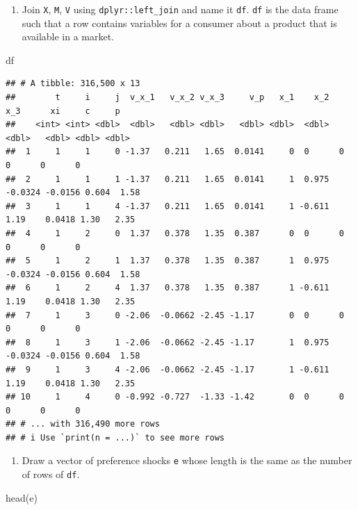 \documentclass[
]{book}
\newenvironment{Shaded}{\begin{snugshade}}{\end{snugshade}}
\newcommand{\FunctionTok}[1]{\textcolor[rgb]{0.00,0.00,0.00}{#1}}
\newcommand{\NormalTok}[1]{#1}
\providecommand{\tightlist}{%
  \setlength{\itemsep}{0pt}\setlength{\parskip}{0pt}}
\begin{document}
\begin{enumerate}
\def\labelenumi{\arabic{enumi}.}
\setcounter{enumi}{4}
\tightlist
\item
  Join \texttt{X}, \texttt{M}, \texttt{V} using \texttt{dplyr::left\_join} and name it \texttt{df}. \texttt{df} is the data frame such that a row contains variables for a consumer about a product that is available in a market.
\end{enumerate}

\begin{Shaded}
\begin{Highlighting}[]
\NormalTok{df}
\end{Highlighting}
\end{Shaded}

\begin{verbatim}
## # A tibble: 316,500 x 13
##        t     i     j  v_x_1   v_x_2 v_x_3     v_p   x_1    x_2     x_3      xi     c     p
##    <int> <int> <dbl>  <dbl>   <dbl> <dbl>   <dbl> <dbl>  <dbl>   <dbl>   <dbl> <dbl> <dbl>
##  1     1     1     0 -1.37   0.211   1.65  0.0141     0  0      0       0      0      0   
##  2     1     1     1 -1.37   0.211   1.65  0.0141     1  0.975 -0.0324 -0.0156 0.604  1.58
##  3     1     1     4 -1.37   0.211   1.65  0.0141     1 -0.611  1.19    0.0418 1.30   2.35
##  4     1     2     0  1.37   0.378   1.35  0.387      0  0      0       0      0      0   
##  5     1     2     1  1.37   0.378   1.35  0.387      1  0.975 -0.0324 -0.0156 0.604  1.58
##  6     1     2     4  1.37   0.378   1.35  0.387      1 -0.611  1.19    0.0418 1.30   2.35
##  7     1     3     0 -2.06  -0.0662 -2.45 -1.17       0  0      0       0      0      0   
##  8     1     3     1 -2.06  -0.0662 -2.45 -1.17       1  0.975 -0.0324 -0.0156 0.604  1.58
##  9     1     3     4 -2.06  -0.0662 -2.45 -1.17       1 -0.611  1.19    0.0418 1.30   2.35
## 10     1     4     0 -0.992 -0.727  -1.33 -1.42       0  0      0       0      0      0   
## # ... with 316,490 more rows
## # i Use `print(n = ...)` to see more rows
\end{verbatim}

\begin{enumerate}
\def\labelenumi{\arabic{enumi}.}
\setcounter{enumi}{5}
\tightlist
\item
  Draw a vector of preference shocks \texttt{e} whose length is the same as the number of rows of \texttt{df}.
\end{enumerate}

\begin{Shaded}
\begin{Highlighting}[]
\FunctionTok{head}\NormalTok{(e)}
\end{Highlighting}
\end{Shaded}
\end{document}
